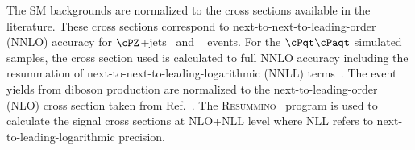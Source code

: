 The SM backgrounds are normalized to the cross sections available 
in the literature. These cross sections correspond to next-to-next-to-leading-order (NNLO) accuracy for $\cPZ$+jets~\cite{Melnikov:2006kv} 
and \wjets~\cite{xsec_WZ} events. For the $\cPqt\cPaqt$ simulated samples, the cross section used is calculated to full NNLO accuracy including
the resummation of next-to-next-to-leading-logarithmic (NNLL) terms~\cite{Czakon:2011xx}.
The event yields from diboson production are normalized to the next-to-leading-order (NLO) cross section  taken from Ref.~\cite{Campbell:2011bn}. 
The \textsc{Resummino}~\cite{Fuks:2012qx,Fuks:2013vua,Fuks:2013lya} program is used to calculate the signal cross sections at NLO+NLL level where 
NLL refers to next-to-leading-logarithmic precision.
